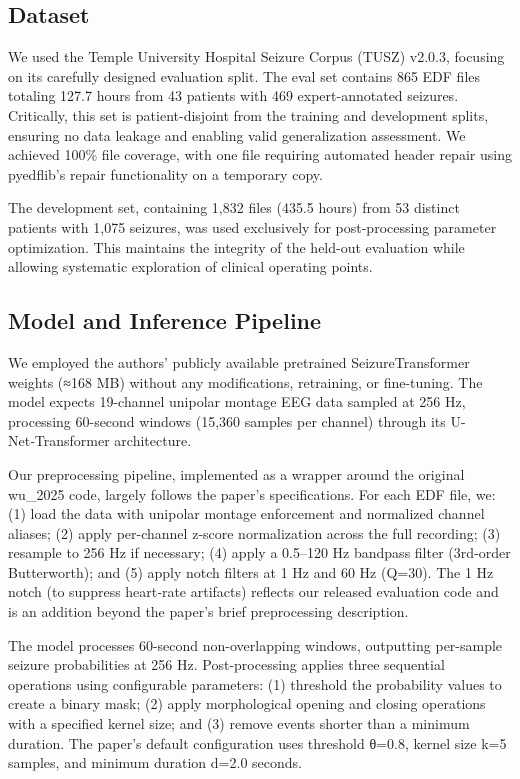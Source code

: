 \documentclass[
  10pt,
]{article}
\begin{document}
\hypertarget{dataset}{%
\subsection{Dataset}\label{dataset}}

We used the Temple University Hospital Seizure Corpus (TUSZ) v2.0.3,
focusing on its carefully designed evaluation split. The eval set
contains 865 EDF files totaling 127.7 hours from 43 patients with 469
expert-annotated seizures. Critically, this set is patient-disjoint from
the training and development splits, ensuring no data leakage and
enabling valid generalization assessment. We achieved 100\% file
coverage, with one file requiring automated header repair using
pyedflib's repair functionality on a temporary copy.

The development set, containing 1,832 files (435.5 hours) from 53
distinct patients with 1,075 seizures, was used exclusively for
post-processing parameter optimization. This maintains the integrity of
the held-out evaluation while allowing systematic exploration of
clinical operating points.

\hypertarget{model-and-inference-pipeline}{%
\subsection{Model and Inference
Pipeline}\label{model-and-inference-pipeline}}

We employed the authors' publicly available pretrained
SeizureTransformer weights (≈168 MB) without any modifications,
retraining, or fine-tuning. The model expects 19-channel unipolar
montage EEG data sampled at 256 Hz, processing 60-second windows (15,360
samples per channel) through its U-Net‑Transformer architecture.

Our preprocessing pipeline, implemented as a wrapper around the original
wu\_2025 code, largely follows the paper's specifications. For each EDF
file, we: (1) load the data with unipolar montage enforcement and
normalized channel aliases; (2) apply per-channel z‑score normalization
across the full recording; (3) resample to 256 Hz if necessary; (4)
apply a 0.5--120 Hz bandpass filter (3rd‑order Butterworth); and (5)
apply notch filters at 1 Hz and 60 Hz (Q=30). The 1 Hz notch (to
suppress heart‑rate artifacts) reflects our released evaluation code and
is an addition beyond the paper's brief preprocessing description.

The model processes 60-second non-overlapping windows, outputting
per-sample seizure probabilities at 256 Hz. Post-processing applies
three sequential operations using configurable parameters: (1) threshold
the probability values to create a binary mask; (2) apply morphological
opening and closing operations with a specified kernel size; and (3)
remove events shorter than a minimum duration. The paper's default
configuration uses threshold θ=0.8, kernel size k=5 samples, and minimum
duration d=2.0 seconds.
\end{document}
